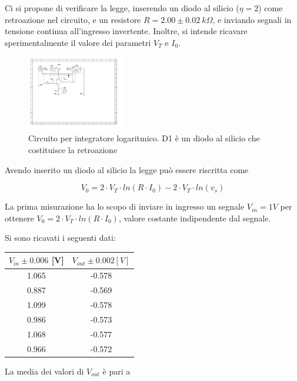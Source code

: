 \documentclass[journal]{IEEEtran}
\begin{document}
Ci si propone di verificare la legge, inserendo un diodo al silicio ($\eta = 2$) come retroazione nel circuito, e un resistore $R = 2.00 \pm 0.02 \ k\Omega$, e inviando segnali in tensione continua all'ingresso invertente. Inoltre, si intende ricavare sperimentalmente il valore dei parametri $V_T$ e $I_0$.

\begin{figure}[H]%
\begin {center}
\includegraphics[width=0.38\textwidth]{sch-simulations/output/OPA-log.pdf}
\caption{Circuito per integratore logaritmico. D1 è un diodo al silicio che costituisce la retroazione}
\label{fig:oscilloscope}
\end {center}
\end{figure}

Avendo inserito un diodo al silicio la legge può essere riscritta come 

\begin{equation}
V_0 = 2 \cdot V_T \cdot ln(R \cdot I_0) - 2 \cdot V_T \cdot ln(v_s)
\end{equation}

La prima misurazione ha lo scopo di inviare in ingresso un segnale $V_{in} = 1V$ per ottenere  $V_0 = 2 \cdot V_T \cdot ln(R \cdot I_0)$, valore costante indipendente dal segnale.

Si sono ricavati i seguenti dati:

\begin{tabular}{|c|c|}
\hline
$V_{in} \pm 0.006 $ [V] & $V_{out} \pm 0.002 [V]$   \\ \hline
1.065 & -0.578 \\ \hline
0.887 & -0.569 \\ \hline
1.099 & -0.578 \\ \hline
0.986 & -0.573 \\ \hline
1.068 & -0.577 \\ \hline
0.966 & -0.572 \\ \hline
\end{tabular}

La media dei valori di $V_{out}$ è pari a 
\end{document}

